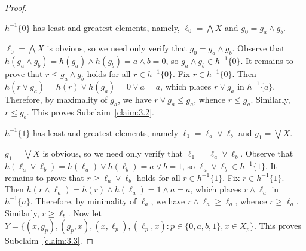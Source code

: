 \begin{proof}
\begin{subclaim}\label{claim:3.2}
$h^{-1}\{0\}$ has least and greatest elements, 
namely, $\ell_0 = \bigwedge X$ and $g_0 = g_a \wedge g_b$.
\end{subclaim}
$\ell_0 = \bigwedge X$ is obvious, so we need only verify that $g_0 = g_a \wedge g_b$. 
Observe that $h(g_a \wedge g_b) = h(g_a) \wedge h(g_b) = a \wedge b = 0$, so 
$g_a \wedge g_b \in h^{-1}\{0\}$. It remains to prove that $r \leqslant g_a \wedge g_b$ holds for all $r \in h^{-1}\{0\}$.
Fix $r \in h^{-1}\{0\}$. Then $h(r \vee g_a) = h(r) \vee h(g_a) = 0 \vee a = a$, which places $r \vee g_a$ in $h^{-1}\{a\}$.  Therefore, 
by maximality of $g_a$, we have $r \vee g_a  \leqslant g_a$, whence 
$r\leqslant g_a$.  Similarly, $r\leqslant g_b$.
This proves Subclaim~\ref{claim:3.2}.

\begin{subclaim}\label{claim:3.3}
$h^{-1}\{1\}$ has least and greatest elements, namely $\ell_1 = \ell_a \vee \ell_b$ and $g_1 = \bigvee X$.
\end{subclaim}
  $g_1 = \bigvee X$ is obvious, so we need only verify that $\ell_1 = \ell_a \vee \ell_b$. 
Observe that $h(\ell_a \vee \ell_b) = h(\ell_a) \vee h(\ell_b) = a \vee b = 1$, so 
$\ell_a \vee \ell_b \in h^{-1}\{1\}$. It remains to prove that $r \geqslant \ell_a \vee \ell_b$ holds for all $r \in h^{-1}\{1\}$.
Fix $r \in h^{-1}\{1\}$. Then $h(r \wedge \ell_a) = h(r) \wedge h(\ell_a) = 1 \wedge a = a$, which places $r \wedge \ell_a$ in $h^{-1}\{a\}$.  Therefore, 
by minimality of $\ell_a$, we have $r \wedge \ell_a  \geqslant \ell_a$, whence 
$r\geqslant \ell_a$.  Similarly, $r\geqslant \ell_b$.
Now let $Y = \{(x, g_p), (g_p, x), (x, \ell_p),(\ell_p, x) : p \in \{0, a, b, 1\}, x \in X_p\}$.
This proves Subclaim~\ref{claim:3.3}.


\end{proof}

